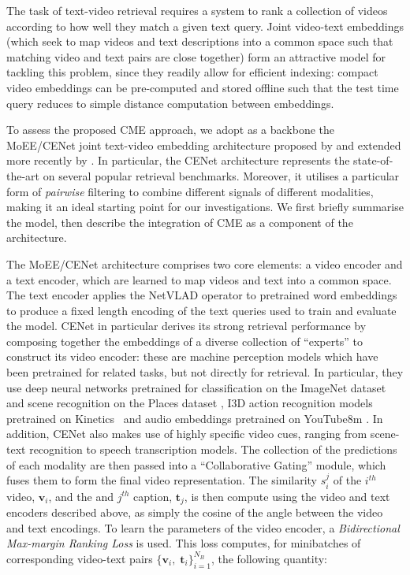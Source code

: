 The task of text-video retrieval requires a system to rank a collection of videos according to how well they match a given text query.  Joint video-text embeddings (which seek to map videos and text descriptions into a common space such that matching video and text pairs are close together) form an attractive model for tackling this problem, since they readily allow for efficient indexing: compact video embeddings can be pre-computed and stored offline such that the test time query reduces to simple distance computation between embeddings.

To assess the proposed CME approach, we adopt as a backbone the MoEE/CENet joint text-video embedding architecture proposed by \cite{miech2018learning} and extended more recently by \cite{liu2019use}.  In particular, the CENet architecture represents the state-of-the-art on several popular retrieval benchmarks.  Moreover, it utilises a particular form of \textit{pairwise} filtering to combine different signals of different modalities, making it an ideal starting point for our investigations.   We first briefly summarise the model, then describe the integration of CME as a component of the architecture.

The MoEE/CENet architecture comprises two core elements: a video encoder and a text encoder, which are learned to map videos and text into a common space.  The text encoder applies the NetVLAD operator \cite{arandjelovic2016netvlad} to pretrained word embeddings to produce a fixed length encoding of the text queries used to train and evaluate the model. CENet in particular derives its strong retrieval performance by composing together the embeddings of a diverse collection of ``experts'' to construct its video encoder: these are machine perception models which have been pretrained for related tasks, but not directly for retrieval.  In particular, they use deep neural networks pretrained for classification on the ImageNet dataset~\cite{deng2009imagenet} and scene recognition on the Places dataset \cite{zhou2017places}, I3D action recognition models pretrained on Kinetics~\cite{kay2017kinetics} and audio embeddings pretrained on YouTube8m \cite{hershey2017cnn}.  In addition, CENet also makes use of highly specific video cues, ranging from scene-text recognition to speech transcription models.  The collection of the predictions of each modality are then passed into a ``Collaborative Gating'' module, which fuses them to form the final video representation.  The similarity $s_i^j$ of the $i^{th}$ video, $\mathbf{v}_i$, and the and $j^{th}$ caption, $\mathbf{t}_j$, is then compute using the video and text encoders described above, as simply the cosine of the angle between the video and text encodings. To learn the parameters of the video encoder, a \textit{Bidirectional Max-margin Ranking Loss} is used.  This loss computes, for minibatches of corresponding video-text pairs $\{\mathbf{v}_i, \; \mathbf{t}_i\}_{i=1}^{N_B}$, the following quantity:


